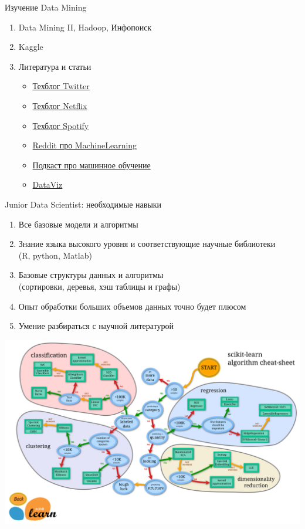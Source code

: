 \documentclass[10pt]{beamer}
\begin{document}
\begin{frame}{Изучение Data Mining}

\begin{enumerate}
\item Data Mining II, Hadoop, Инфопоиск
\item Kaggle
\item Литература и статьи
\begin{itemize}
\item\href{https://blog.twitter.com/engineering}{Техблог Twitter}
\item\href{http://techblog.netflix.com/?m=1}{Техблог Netflix}
\item\href{https://labs.spotify.com/}{Техблог Spotify}
\item\href{http://www.reddit.com/r/MachineLearning/}{Reddit про MachineLearning}
\item\href{http://www.thetalkingmachines.com/}{Подкаст про машинное обучение}
\item\href{http://flowingdata.com/}{DataViz}
\end{itemize}
\end{enumerate}

\end{frame}

\begin{frame}{Junior Data Scientist: необходимые навыки}

\begin{enumerate}
\item Все базовые модели и алгоритмы
\item Знание языка высокого уровня и соответствующие научные библиотеки \\ (R, python, Matlab)
\item Базовые структуры данных и алгоритмы \\ (сортировки, деревья, хэш таблицы и графы)
\item Опыт обработки больших объемов данных точно будет плюсом
\item Умение разбираться с научной литературой
\end{enumerate}

\end{frame}

\begin{frame}{}
\begin{center}
\includegraphics[scale=0.08]{images/sklearn.png}
\end{center}
\end{frame}
\end{document}

